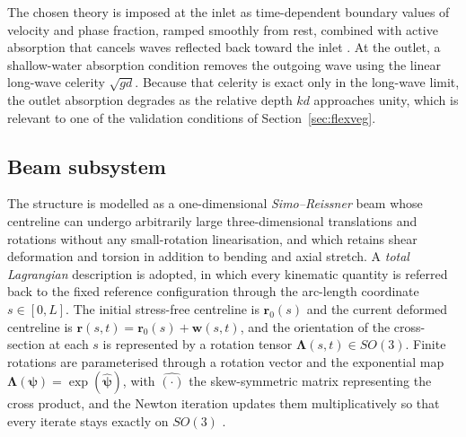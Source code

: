 \noindent
The chosen theory is imposed at the inlet as time-dependent boundary values of velocity and phase fraction, ramped smoothly from rest, combined with active absorption that cancels waves reflected back toward the inlet \citep{higuera_realistic_2013}. At the outlet, a shallow-water absorption condition removes the outgoing wave using the linear long-wave celerity $\sqrt{gd}$. Because that celerity is exact only in the long-wave limit, the outlet absorption degrades as the relative depth $kd$ approaches unity, which is relevant to one of the validation conditions of Section~\ref{sec:flexveg}.

\subsection{Beam subsystem}
\label{sec:beamSection}

\noindent
The structure is modelled as a one-dimensional \emph{Simo--Reissner} beam whose centreline can undergo arbitrarily large three-dimensional translations and rotations without any small-rotation linearisation, and which retains shear deformation and torsion in addition to bending and axial stretch. A \emph{total Lagrangian} description is adopted, in which every kinematic quantity is referred back to the fixed reference configuration through the arc-length coordinate $s \in [0,L]$. The initial stress-free centreline is $\mathbf{r}_0(s)$ and the current deformed centreline is $\mathbf{r}(s,t) = \mathbf{r}_0(s) + \mathbf{w}(s,t)$, and the orientation of the cross-section at each $s$ is represented by a rotation tensor $\boldsymbol{\Lambda}(s,t) \in SO(3)$. Finite rotations are parameterised through a rotation vector and the exponential map $\boldsymbol{\Lambda}(\boldsymbol{\psi}) = \exp(\widehat{\boldsymbol{\psi}})$, with $\widehat{(\cdot)}$ the skew-symmetric matrix representing the cross product, and the Newton iteration updates them multiplicatively so that every iterate stays exactly on $SO(3)$ \citep{dai_eulerrodrigues_2015,spurrier_comment_1978}.

